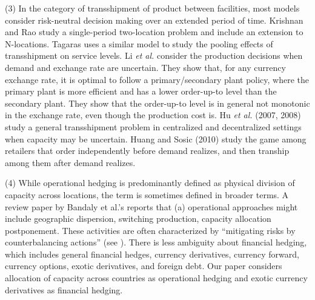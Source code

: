 \documentclass[mnsc,nonblindrev,copyedit]{informs2_wz} %
\begin{document}
(3) In the category of transshipment of product between facilities, most models consider risk-neutral decision making over an extended period of time.  Krishnan and Rao \cite{Krishnan1965} study a single-period two-location problem and include an extension to N-locations.  Tagaras \cite{Tagaras1992} uses a similar model to study the pooling effects of transshipment on service levels.  Li {\it et al.} \cite{Li2001} consider the production decisions when demand and exchange rate are uncertain.  They show that, for any currency exchange rate, it is optimal to follow a primary/secondary plant policy, where the primary plant is more efficient and has a lower order-up-to level than the secondary plant.  They show that the order-up-to level is in general not monotonic in the exchange rate, even though the production cost is.  Hu {\it et al.} (2007, 2008) study a general transshipment problem in centralized and decentralized settings when capacity may be uncertain. Huang and Sosic (2010) study the game among retailers that order independently before demand realizes, and then tranship among them after demand realizes.

\medskip



(4) While operational hedging is predominantly defined as physical division of capacity across locations, the term is sometimes defined in broader terms.  A review paper by Bandaly et al.'s \cite{Bandaly_supply_2010} reports that (a) operational approaches might include geographic dispersion, switching production, capacity allocation postponement. These activities are often characterized by ``mitigating risks by counterbalancing actions'' (see \cite{vanmieghem2003}).  %
There is less ambiguity about financial hedging, which includes general financial hedges, currency derivatives, currency forward, currency options, exotic derivatives, and foreign debt. 
Our paper considers allocation of capacity across countries as operational hedging and exotic currency derivatives as financial hedging.
\end{document}
